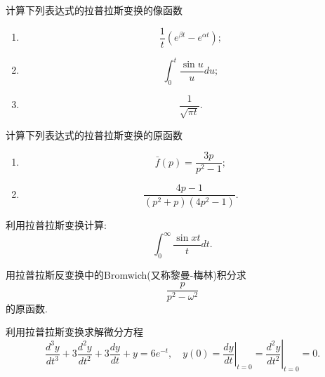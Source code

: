 \documentclass[10pt]{article}
\newenvironment{problem}[2][]{\begin{trivlist}
\item[\hskip \labelsep {\bfseries #1}\hskip \labelsep {\bfseries #2}]}{\end{trivlist}}
\begin{document}
\renewcommand{\labelenumi}{(\arabic{enumi})}
\renewcommand{\labelenumii}{(\arabic{enumi}.\arabic{enumii})}



 




\begin{problem}{7.1}
  计算下列表达式的拉普拉斯变换的像函数
  \begin{enumerate}
    \item $$
    \frac{1}{t}\left(e^{\beta t}-e^{\alpha t}\right) ;
    $$
    \item $$
    \int_0^t \frac{\sin u}{u} d u;
    $$
    \item 
    $$
    \frac{1}{\sqrt{\pi t}}.
    $$
  \end{enumerate}
\end{problem}

\begin{problem}{7.2}
  计算下列表达式的拉普拉斯变换的原函数
  \begin{enumerate}
    \item $$
    \bar{f}(p)=\frac{3 p}{p^2-1} ;
    $$
    \item $$
    \frac{4 p-1}{\left(p^2+p\right)\left(4 p^2-1\right)}.
    $$
  \end{enumerate}
\end{problem}
  
\begin{problem}{7.3}
  利用拉普拉斯变换计算:  $$\int_0^{\infty} \frac{\sin x t}{t} dt. $$
\end{problem}
   
\begin{problem}{7.4}
用拉普拉斯反变换中的Bromwich(又称黎曼-梅林)积分求
$$
\frac{p}{p^2 - \omega^2}
$$
的原函数.
\end{problem}

\begin{problem}{7.5}
  利用拉普拉斯变换求解微分方程
  $$
    \frac{d^3 y}{d t^3}+3 \frac{d^2 y}{d t^2}+3 \frac{d y}{d t}+y=6 e^{-t}, 
    \quad y(0)=\left.\frac{d y}{d t}\right|_{t=0}=\left.\frac{d^2 y}{d t^2}\right|_{t=0}=0 .
  $$
\end{problem}
\end{document}
